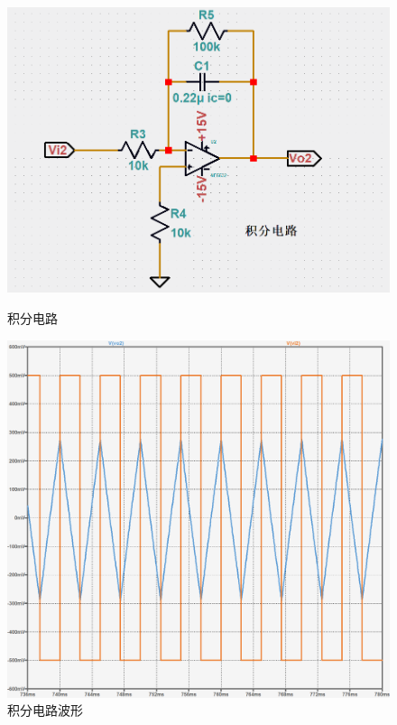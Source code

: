 \documentclass[a4paper]{article}
\theoremstyle{definition}
\theoremstyle{plain}
\theoremstyle{remark}
\begin{document}
\begin{figure}[H]
	\begin{minipage}[t]{0.5\linewidth}
		\centering
		\includegraphics[width=1\textwidth]{积分电路}
		\caption{积分电路}
		\label{积分电路}
	\end{minipage}%
	\begin{minipage}[t]{0.5\linewidth}
		\centering
		\includegraphics[width=1\textwidth]{积分电路波形}
		\caption{积分电路波形}
		\label{积分电路波形}
	\end{minipage}
\end{figure}
\end{document}
